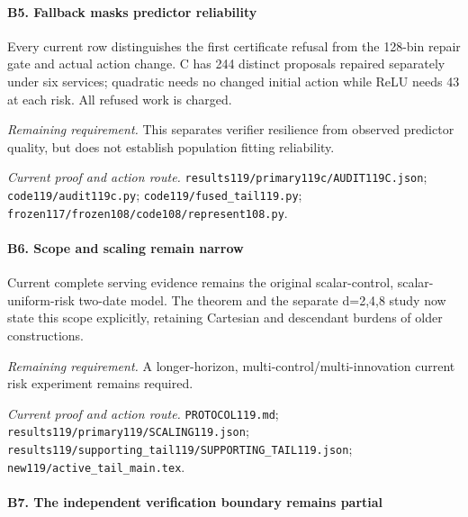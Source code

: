 \paragraph{B5. Fallback masks predictor reliability}

Every current row distinguishes the first certificate refusal from the 128-bin repair gate and actual action change. C has 244 distinct proposals repaired separately under six services; quadratic needs no changed initial action while ReLU needs 43 at each risk. All refused work is charged.

\par\emph{Remaining requirement.} This separates verifier resilience from observed predictor quality, but does not establish population fitting reliability.

\par\emph{Current proof and action route.} \nolinkurl{results119/primary119c/AUDIT119C.json}; \nolinkurl{code119/audit119c.py}; \nolinkurl{code119/fused_tail119.py}; \nolinkurl{frozen117/frozen108/code108/represent108.py}.

\paragraph{B6. Scope and scaling remain narrow}

Current complete serving evidence remains the original scalar-control, scalar-uniform-risk two-date model. The theorem and the separate d=2,4,8 study now state this scope explicitly, retaining Cartesian and descendant burdens of older constructions.

\par\emph{Remaining requirement.} A longer-horizon, multi-control/\allowbreak{}multi-innovation current risk experiment remains required.

\par\emph{Current proof and action route.} \nolinkurl{PROTOCOL119.md}; \nolinkurl{results119/primary119/SCALING119.json}; \nolinkurl{results119/supporting_tail119/SUPPORTING_TAIL119.json}; \nolinkurl{new119/active_tail_main.tex}.

\paragraph{B7. The independent verification boundary remains partial}

